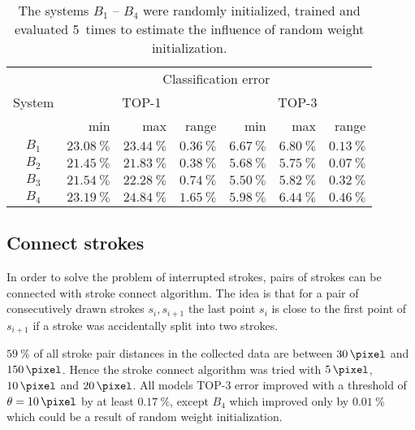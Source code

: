 \documentclass[9pt,technote]{IEEEtran}
\begin{document}
\begin{table}[h]
    \centering
    \begin{tabular}{crrr|rrr} %
    \toprule
    \multirow{3}{*}{System}  & \multicolumn{6}{c}{Classification error}\\
    \cmidrule(l){2-7}
          & \multicolumn{3}{c}{TOP-1}   & \multicolumn{3}{c}{TOP-3}\\
          & min                    & max                    & range                 & min                   & max                   & range\\\midrule
    $B_1$ & $\SI{23.08}{\percent}$ & $\SI{23.44}{\percent}$ & $\SI{0.36}{\percent}$ & $\SI{6.67}{\percent}$ & $\SI{6.80}{\percent}$ & $\SI{0.13}{\percent}$ \\
    $B_2$ & \underline{$\SI{21.45}{\percent}$} & \underline{$\SI{21.83}{\percent}$}& $\SI{0.38}{\percent}$ & $\SI{5.68}{\percent}$ & \underline{$\SI{5.75}{\percent}$} & $\SI{0.07}{\percent}$\\
    $B_3$ & $\SI{21.54}{\percent}$ & $\SI{22.28}{\percent}$ & $\SI{0.74}{\percent}$ & \underline{$\SI{5.50}{\percent}$} & $\SI{5.82}{\percent}$ & $\SI{0.32}{\percent}$\\
    $B_4$ & $\SI{23.19}{\percent}$ & $\SI{24.84}{\percent}$ & $\SI{1.65}{\percent}$ & $\SI{5.98}{\percent}$ & $\SI{6.44}{\percent}$ & $\SI{0.46}{\percent}$\\
    \bottomrule
    \end{tabular}
    \caption{The systems $B_1$ -- $B_4$ were randomly initialized, trained
             and evaluated 5~times to estimate the influence of random weight
             initialization.}
\label{table:baseline-systems-random-initializations-summary}
\end{table}

\subsection{Connect strokes}
In order to solve the problem of interrupted strokes, pairs of strokes
can be connected with stroke connect algorithm. The idea is that for
a pair of consecutively drawn strokes $s_{i}, s_{i+1}$ the last point $s_i$ is
close to the first point of $s_{i+1}$ if a stroke was accidentally split
into two strokes.

$\SI{59}{\percent}$ of all stroke pair distances in the collected data are
between $\SI{30}{\pixel}$ and $\SI{150}{\pixel}$. Hence the stroke connect
algorithm was tried with $\SI{5}{\pixel}$, $\SI{10}{\pixel}$ and
$\SI{20}{\pixel}$.
All models TOP-3 error improved with a threshold of $\theta = \SI{10}{\pixel}$
by at least $\SI{0.17}{\percent}$, except $B_4$ which improved only by
$\SI{0.01}{\percent}$ which could be a result of random weight initialization.
\end{document}
